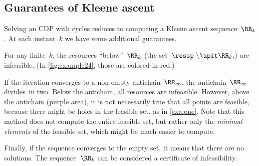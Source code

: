 \subsection{Guarantees of Kleene ascent}

Solving an CDP with cycles reduces to computing a Kleene ascent sequence~$\RR_{k}$.
At each instant~$k$ we have some additional guarantees.

For any finite~$k$, the resources ``below''~$\RR_{k}$ (the set~$\ressp\ \backslash\upit\RR_{k}$,) are infeasible.
(In \cref{fig:example24}, those are colored in red.)

If the iteration converges to a non-empty antichain~$\RR_{\infty}$, the antichain~$\RR_{\infty}$ divides~\ressp in two.
Below the antichain, all resources are infeasible.
However, above the antichain (purple area), it is not necessarily true that all points are feasible, because there might be holes in the feasible set, as in \cref{exa:one}.
Note that this method does not compute the entire feasible set, but rather only the \emph{minimal elements} of the feasible set, which might be much easier to compute.

Finally, if the sequence converges to the empty set, it means that there are no solutions.
The sequence~$\RR_{k}$ can be considered a certificate of infeasibility.
